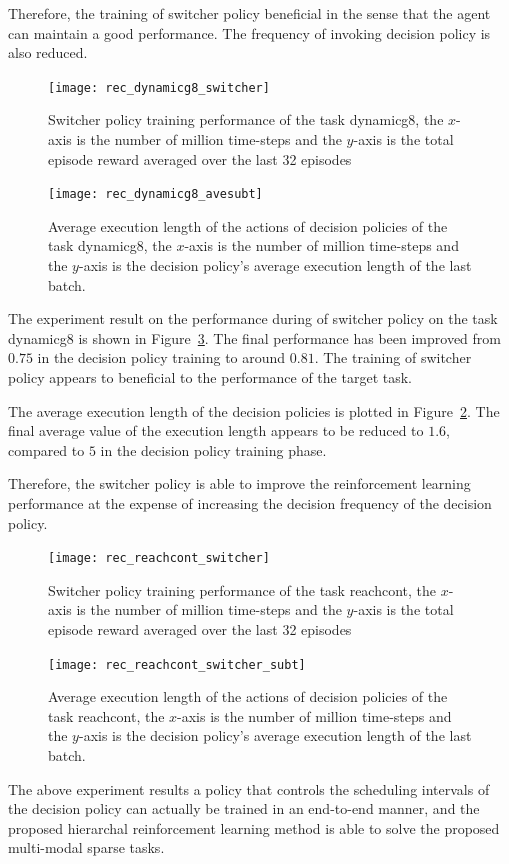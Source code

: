 Therefore, the training of switcher policy beneficial in the sense that the agent can maintain a good performance. The frequency of invoking decision policy is also reduced.
\begin{figure}[!htbp]
	\centering
	\texttt{[image: rec\_dynamicg8\_switcher]}
	\caption{Switcher policy training performance of the task dynamicg8, the $x$-axis is the number of million time-steps and the $y$-axis is the total episode reward averaged over the last 32 episodes}
	\label{fig:rec_dynamicg8_switcher}
\end{figure}

\begin{figure}[!htbp]
	\centering
	\texttt{[image: rec\_dynamicg8\_avesubt]}
	\caption{Average execution length of the actions of decision policies of the task dynamicg8, the $x$-axis is the number of million time-steps and the $y$-axis is the decision policy's average execution length of the last batch.}
	\label{fig:rec_dynamicg8_avesubt}
\end{figure}

The experiment result on the performance during of switcher policy on the task dynamicg8 is shown in Figure~\ref{fig:rec_reachcont_switcher}. The final performance has been improved from $0.75$ in the decision policy training to around $0.81$. The training of switcher policy appears to beneficial to the performance of the target task.

The average execution length of the decision policies is plotted in Figure~\ref{fig:rec_dynamicg8_avesubt}. The final average value of the execution length appears to be reduced to $1.6$, compared to $5$ in the decision policy training phase.

Therefore, the switcher policy is able to improve the reinforcement learning performance at the expense of increasing the decision frequency of the decision policy.

\begin{figure}[!htbp]
	\centering
	\texttt{[image: rec\_reachcont\_switcher]}
	\caption{Switcher policy training performance of the task reachcont, the $x$-axis is the number of million time-steps and the $y$-axis is the total episode reward averaged over the last 32 episodes}
	\label{fig:rec_reachcont_switcher}
\end{figure}

\begin{figure}[!htbp]
	\centering
	\texttt{[image: rec\_reachcont\_switcher\_subt]}
	\caption{Average execution length of the actions of decision policies of the task reachcont, the $x$-axis is the number of million time-steps and the $y$-axis is the decision policy's average execution length of the last batch.}
	\label{fig:rec_reachcont_switcher_subt}
\end{figure}

The above experiment results a policy that controls the scheduling intervals of the decision policy can actually be trained in an end-to-end manner, and the proposed hierarchal reinforcement learning method is able to solve the proposed multi-modal sparse tasks.